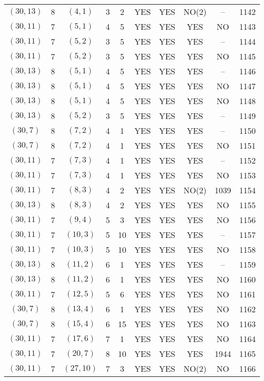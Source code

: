 \begin{longtable}{|c|c|c|c|c|c|c|c|c|c|}
$(30, 13)$ & 8 & $(4, 1)$ & 3 & 2 & YES & YES & NO(2) & -- & 1142\\
$(30, 11)$ & 7 & $(5, 1)$ & 4 & 5 & YES & YES & YES & NO & 1143\\
$(30, 11)$ & 7 & $(5, 2)$ & 3 & 5 & YES & YES & YES & -- & 1144\\
$(30, 11)$ & 7 & $(5, 2)$ & 3 & 5 & YES & YES & YES & NO & 1145\\
$(30, 13)$ & 8 & $(5, 1)$ & 4 & 5 & YES & YES & YES & -- & 1146\\
$(30, 13)$ & 8 & $(5, 1)$ & 4 & 5 & YES & YES & YES & NO & 1147\\
$(30, 13)$ & 8 & $(5, 1)$ & 4 & 5 & YES & YES & YES & NO & 1148\\
$(30, 13)$ & 8 & $(5, 2)$ & 3 & 5 & YES & YES & YES & -- & 1149\\
$(30, 7)$ & 8 & $(7, 2)$ & 4 & 1 & YES & YES & YES & -- & 1150\\
$(30, 7)$ & 8 & $(7, 2)$ & 4 & 1 & YES & YES & YES & NO & 1151\\
$(30, 11)$ & 7 & $(7, 3)$ & 4 & 1 & YES & YES & YES & -- & 1152\\
$(30, 11)$ & 7 & $(7, 3)$ & 4 & 1 & YES & YES & YES & NO & 1153\\
$(30, 11)$ & 7 & $(8, 3)$ & 4 & 2 & YES & YES & NO(2) & 1039 & 1154\\
$(30, 13)$ & 8 & $(8, 3)$ & 4 & 2 & YES & YES & YES & NO & 1155\\
$(30, 11)$ & 7 & $(9, 4)$ & 5 & 3 & YES & YES & YES & NO & 1156\\
$(30, 11)$ & 7 & $(10, 3)$ & 5 & 10 & YES & YES & YES & -- & 1157\\
$(30, 11)$ & 7 & $(10, 3)$ & 5 & 10 & YES & YES & YES & NO & 1158\\
$(30, 13)$ & 8 & $(11, 2)$ & 6 & 1 & YES & YES & YES & -- & 1159\\
$(30, 13)$ & 8 & $(11, 2)$ & 6 & 1 & YES & YES & YES & NO & 1160\\
$(30, 11)$ & 7 & $(12, 5)$ & 5 & 6 & YES & YES & YES & NO & 1161\\
$(30, 7)$ & 8 & $(13, 4)$ & 6 & 1 & YES & YES & YES & NO & 1162\\
$(30, 7)$ & 8 & $(15, 4)$ & 6 & 15 & YES & YES & YES & NO & 1163\\
$(30, 11)$ & 7 & $(17, 6)$ & 7 & 1 & YES & YES & YES & NO & 1164\\
$(30, 11)$ & 7 & $(20, 7)$ & 8 & 10 & YES & YES & YES & 1944 & 1165\\
$(30, 11)$ & 7 & $(27, 10)$ & 7 & 3 & YES & YES & NO(2) & NO & 1166\\

\end{longtable}
